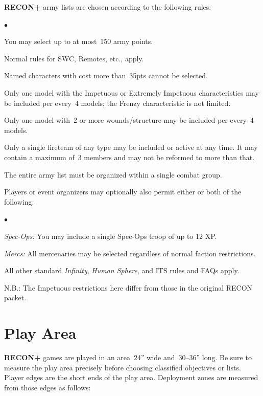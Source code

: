 \documentclass[14pt,dvipsnames]{extarticle}
\newenvironment{squishitemize}
{\begin{list}{$\bullet$}{%
    \setlength{\itemsep}{2pt}%
    \setlength{\parsep}{2pt}%
    \setlength{\topsep}{2pt}%
    \setlength{\parskip}{0pt} %
    \renewcommand{\labelitemi}{--}}}
  {\end{list}}
\newcommand{\reconplus}{\textbf{RECON+}\xspace}
\begin{document}
\reconplus army lists are chosen according to the following rules:

\begin{squishitemize}
\item You may select up to at most~150 army points.
\item Normal rules for SWC, Remotes, etc., apply.
\item Named characters with cost more than~35pts cannot be selected.
\item Only one model with the Impetuous or Extremely Impetuous
  characteristics may be included per every~4 models; the Frenzy
  characteristic is not limited.
\item Only one model with~2 or more wounds/structure may be included per
  every~4 models.
\item Only a single fireteam of any type may be included or active at
  any time.  It may contain a maximum of~3 members and may not be
  reformed to more than that.
\item The entire army list must be organized within a single combat
  group.
\end{squishitemize}

Players or event organizers may optionally also permit either or both
of the following:

\begin{squishitemize}
\item \emph{Spec-Ops:} You may include a single Spec-Ops troop of up to 12 XP.
\item \emph{Mercs:} All mercenaries may be selected regardless of normal
  faction restrictions.
\end{squishitemize}

All other standard \emph{Infinity}, \emph{Human Sphere}, and ITS rules
and FAQs apply.

\begin{recon}
  N.B.: The Impetuous restrictions here differ from those in the
  original RECON packet.
\end{recon}



\section{Play Area}

\reconplus games are played in an area~24'' wide and~30--36'' long.
Be sure to measure the play area precisely before choosing classified
objectives or lists.  Player edges are the short ends of the play
area.  Deployment zones are measured from those edges as follows:
\end{document}
